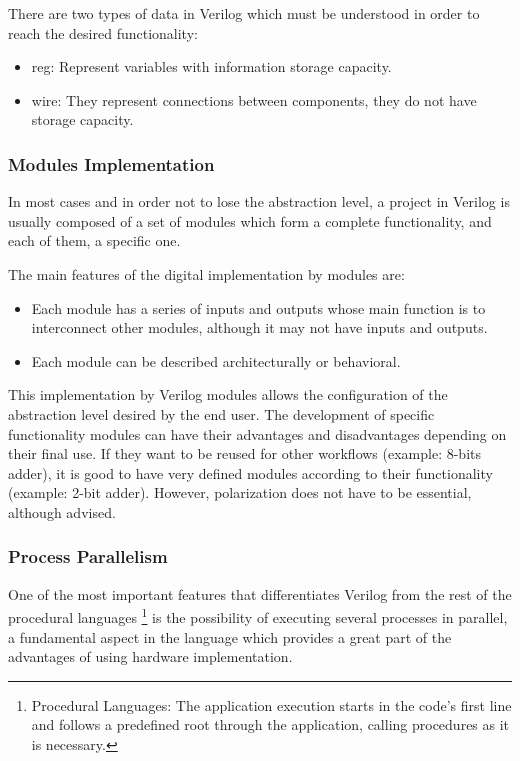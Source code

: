 There are two types of data in Verilog which must be understood in order to reach the desired functionality:
\begin{itemize}
	\item reg: Represent variables with information storage capacity.
	\item wire: They represent connections between components, they do not have storage capacity.
\end{itemize}

\subsubsection{Modules Implementation}
In most cases and in order not to lose the abstraction level, a project in Verilog\cite{496013} is usually composed of a set of modules which form a complete functionality, and each of them, a specific one. \newline

The main features of the digital implementation by modules are:
\begin{itemize}
	\item Each module has a series of inputs and outputs whose main function is to interconnect other modules, although it may not have inputs and outputs.
	\item Each module can be described architecturally or behavioral.
\end{itemize}

This implementation by Verilog modules allows the configuration of the abstraction level desired by the end user. The development of specific functionality modules can have their advantages and disadvantages depending on their final use. If they want to be reused for other workflows (example: 8-bits adder), it is good to have very defined modules according to their functionality (example: 2-bit adder). However, polarization does not have to be essential, although advised.

\subsubsection{Process Parallelism}
One of the most important features that differentiates Verilog from the rest of the procedural languages \footnote{Procedural Languages: The application execution starts in the code’s first line and follows a predefined root through the application, calling procedures as it is necessary.} is the possibility of executing several processes in parallel, a fundamental aspect in the language which provides a great part of the advantages of using hardware implementation.

